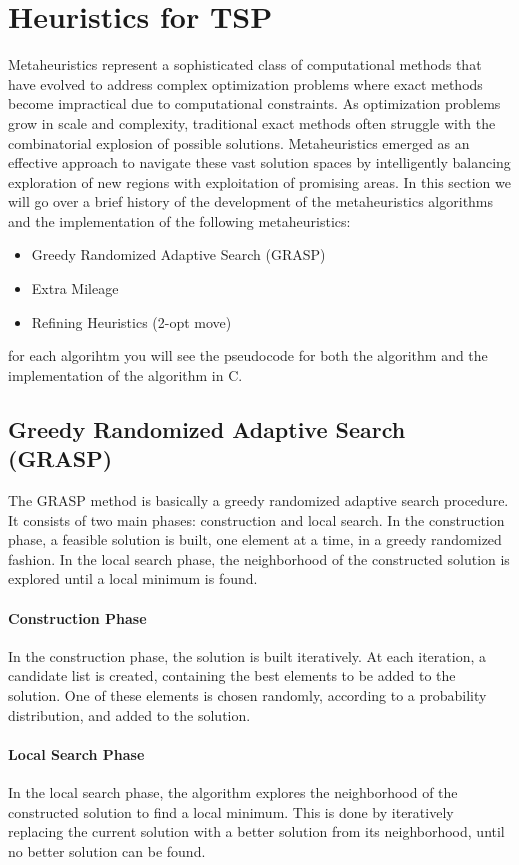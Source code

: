 \documentclass{article}
\begin{document}
\cleardoublepage

\section{Heuristics for TSP}
Metaheuristics represent a sophisticated class of computational methods that have evolved to address complex optimization problems where exact methods become impractical due to computational constraints. 
As optimization problems grow in scale and complexity, traditional exact methods often struggle with the combinatorial explosion of possible solutions. 
Metaheuristics emerged as an effective approach to navigate these vast solution spaces by intelligently balancing exploration of new regions with exploitation of promising areas.
In this section we will go over a brief history of the development of the metaheuristics algorithms and the implementation of the following metaheuristics:
\begin{itemize}
	\item Greedy Randomized Adaptive Search (GRASP)
	\item Extra Mileage
	\item Refining Heuristics (2-opt move)
\end{itemize}
for each algorihtm you will see the pseudocode for both the algorithm and the implementation of the algorithm in C.


\subsection{Greedy Randomized Adaptive Search (GRASP)}
The GRASP method is basically a greedy randomized adaptive search procedure.
It consists of two main phases: construction and local search.
In the construction phase, a feasible solution is built, one element at a time, in a greedy randomized fashion.
In the local search phase, the neighborhood of the constructed solution is explored until a local minimum is found.

\paragraph{Construction Phase}
In the construction phase, the solution is built iteratively. At each iteration, a candidate list is created,
containing the best elements to be added to the solution. One of these elements is chosen randomly, according
to a probability distribution, and added to the solution.

\paragraph{Local Search Phase}
In the local search phase, the algorithm explores the neighborhood of the constructed solution to find a local minimum.
This is done by iteratively replacing the current solution with a better solution from its neighborhood,
until no better solution can be found.
\end{document}
